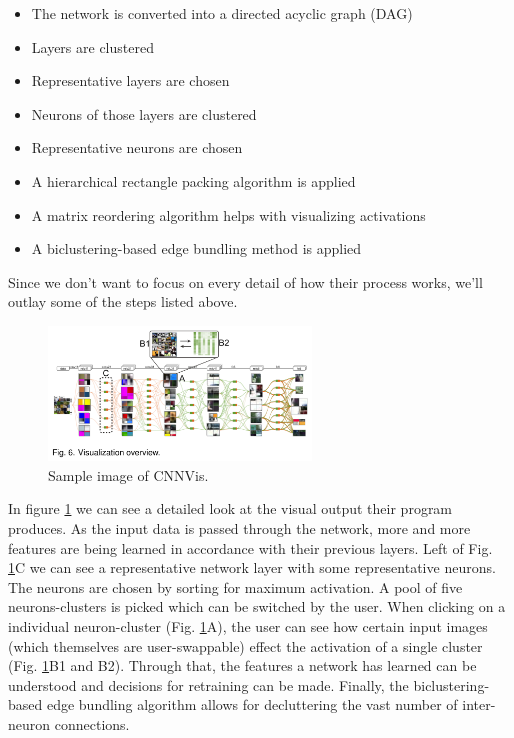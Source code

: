 \documentclass{acmsiggraph}               %
\begin{document}
\begin{itemize}
  \item The network is converted into a directed acyclic graph (DAG)
  \item Layers are clustered
  \item Representative layers are chosen
  \item Neurons of those layers are clustered
  \item Representative neurons are chosen
  \item A hierarchical rectangle packing algorithm is applied
  \item A matrix reordering algorithm helps with visualizing activations
  \item A biclustering-based edge bundling method is applied
\end{itemize}

Since we don't want to focus on every detail of how their process works, we'll outlay some of the steps listed above.\\

\begin{figure}
  \centering
  \includegraphics[width=2.75in]{cnnvis_detail}
  \caption{Sample image of CNNVis. \protect\cite{Liu2016}}
  \label{fig:cnnvis_detail}
\end{figure}

In figure \ref{fig:cnnvis_detail} we can see a detailed look at the visual output their program produces. As the input data is passed through the network, more and more features are being learned in accordance with their previous layers. Left of Fig. \ref{fig:cnnvis_detail}C we can see a representative network layer with some representative neurons. The neurons are chosen by sorting for maximum activation. A pool of five neurons-clusters is picked which can be switched by the user. When clicking on a individual neuron-cluster (Fig. \ref{fig:cnnvis_detail}A), the user can see how certain input images (which themselves are user-swappable) effect the activation of a single cluster (Fig. \ref{fig:cnnvis_detail}B1 and B2). Through that, the features a network has learned can be understood and decisions for retraining can be made. Finally, the biclustering-based edge bundling algorithm allows for decluttering the vast number of inter-neuron connections.\\
\end{document}

